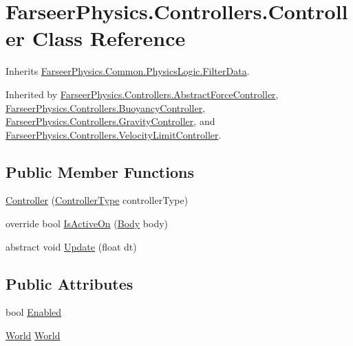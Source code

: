\hypertarget{class_farseer_physics_1_1_controllers_1_1_controller}{\section{Farseer\+Physics.\+Controllers.\+Controller Class Reference}
\label{class_farseer_physics_1_1_controllers_1_1_controller}
}


Inherits \hyperlink{class_farseer_physics_1_1_common_1_1_physics_logic_1_1_filter_data}{Farseer\+Physics.\+Common.\+Physics\+Logic.\+Filter\+Data}.



Inherited by \hyperlink{class_farseer_physics_1_1_controllers_1_1_abstract_force_controller}{Farseer\+Physics.\+Controllers.\+Abstract\+Force\+Controller}, \hyperlink{class_farseer_physics_1_1_controllers_1_1_buoyancy_controller}{Farseer\+Physics.\+Controllers.\+Buoyancy\+Controller}, \hyperlink{class_farseer_physics_1_1_controllers_1_1_gravity_controller}{Farseer\+Physics.\+Controllers.\+Gravity\+Controller}, and \hyperlink{class_farseer_physics_1_1_controllers_1_1_velocity_limit_controller}{Farseer\+Physics.\+Controllers.\+Velocity\+Limit\+Controller}.

\subsection*{Public Member Functions}
\begin{DoxyCompactItemize}
\item 
\hyperlink{class_farseer_physics_1_1_controllers_1_1_controller_aa6e650f4049a56b8022d6b6ee688542d}{Controller} (\hyperlink{namespace_farseer_physics_1_1_controllers_a0b34b986191b1dd53a0a4169d1add7c7}{Controller\+Type} controller\+Type)
\item 
override bool \hyperlink{class_farseer_physics_1_1_controllers_1_1_controller_af4c2a3233d1d1a1b9b54311b7776cd97}{Is\+Active\+On} (\hyperlink{class_farseer_physics_1_1_dynamics_1_1_body}{Body} body)
\item 
abstract void \hyperlink{class_farseer_physics_1_1_controllers_1_1_controller_a1aff9a8d046a6e511d900d5eb354f3ea}{Update} (float dt)
\end{DoxyCompactItemize}
\subsection*{Public Attributes}
\begin{DoxyCompactItemize}
\item 
bool \hyperlink{class_farseer_physics_1_1_controllers_1_1_controller_a1697ca951f7473b9e293db648b52c184}{Enabled}
\item 
\hyperlink{class_farseer_physics_1_1_dynamics_1_1_world}{World} \hyperlink{class_farseer_physics_1_1_controllers_1_1_controller_ac759af410d23b3ae5fc26a3081b1bde6}{World}
\end{DoxyCompactItemize}


